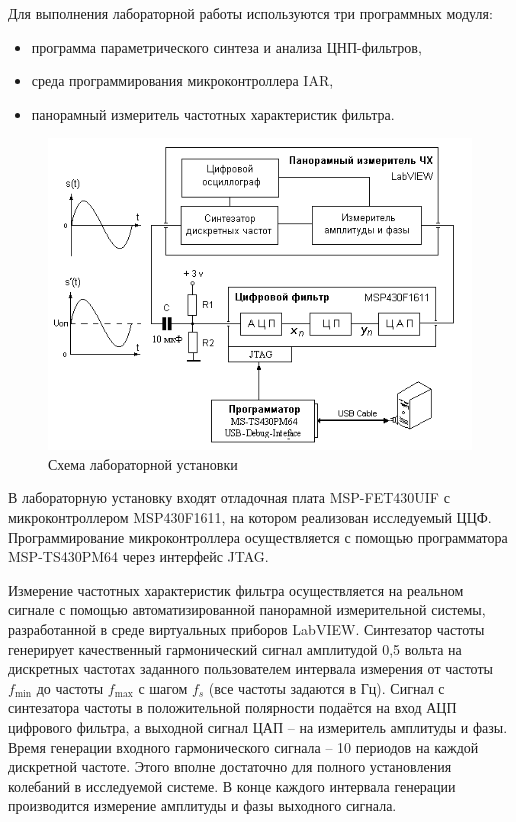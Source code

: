 Для выполнения лабораторной работы используются три программных модуля: 
\begin{itemize}
  \item программа параметрического синтеза и анализа ЦНП-фильтров,
  \item среда программирования микроконтроллера IAR,
  \item панорамный измеритель частотных характеристик фильтра. 
\end{itemize}
\begin{figure}[H]
  \centering
  \includegraphics[width=\textwidth]{imgs/img3}
  \caption{Схема лабораторной установки}
  \label{fig:figure3}
\end{figure}

В лабораторную установку входят отладочная плата MSP-FET430UIF с микроконтроллером MSP430F1611, на котором реализован исследуемый ЦЦФ. Программирование микроконтроллера осуществляется с помощью программатора MSP-TS430PM64 через интерфейс JTAG. 

Измерение частотных характеристик фильтра осуществляется на реальном сигнале с помощью автоматизированной панорамной измерительной системы, разработанной в среде виртуальных приборов LabVIEW. Синтезатор частоты генерирует качественный гармонический сигнал амплитудой 0,5 вольта на дискретных частотах заданного пользователем интервала измерения от частоты $f_{\min}$ до частоты $f_{\max}$ с шагом $f_s$ (все частоты задаются в Гц). Сигнал с синтезатора частоты в положительной полярности подаётся на вход АЦП цифрового фильтра, а выходной сигнал ЦАП – на измеритель амплитуды и фазы. Время генерации входного гармонического сигнала -- 10 периодов на каждой дискретной частоте. Этого вполне достаточно для полного установления колебаний в исследуемой системе. В конце каждого интервала генерации производится измерение амплитуды и фазы выходного сигнала. 
  
